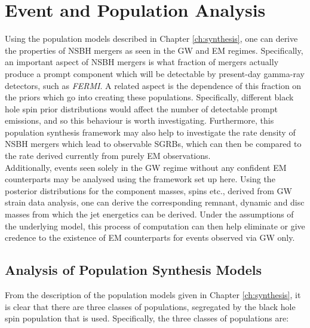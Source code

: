 \chapter{Event and Population Analysis}\label{ch:analysis}

    Using the population models described in Chapter \ref{ch:synthesis}, one can derive
    the properties of NSBH mergers as seen in the GW and EM regimes.  Specifically, an
    important aspect of NSBH mergers is what fraction of mergers actually produce a
    prompt component which will be detectable by present-day gamma-ray detectors, such
    as \textit{FERMI}. A related aspect is the dependence of this fraction on the priors
    which go into creating these populations. Specifically, different black hole spin
    prior distributions would affect the number of detectable prompt emissions, and so
    this behaviour is worth investigating. Furthermore, this population synthesis
    framework may also help to investigate the rate density of NSBH mergers which lead
    to observable SGRBs, which can then be compared to the rate derived currently from
    purely EM observations.\\
    Additionally, events seen solely in the GW regime without any confident EM
    counterparts may be analysed using the framework set up here. Using the posterior
    distributions for the component masses, spins etc., derived from GW strain data
    analysis, one can derive the corresponding remnant, dynamic and disc masses from
    which the jet energetics can be derived. Under the assumptions of the underlying
    model, this process of computation can then help eliminate or give credence to the
    existence of EM counterparts for events observed via GW only.

\section{Analysis of Population Synthesis Models}

    From the description of the population models given in Chapter \ref{ch:synthesis},
    it is clear that there are three classes of populations, segregated by the black
    hole spin population that is used. Specifically, the three classes of populations
    are:

